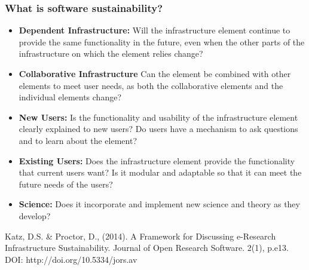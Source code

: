 \begin{frame}
\frametitle{What is software sustainability?} 
\begin{itemize}
\item {\bf Dependent Infrastructure:} Will the infrastructure element continue to provide the same functionality in the future, even when the other parts of the infrastructure on which the element relies change?
\item {\bf Collaborative Infrastructure} Can the element be combined with other elements to meet user needs, as both the collaborative elements and the individual elements change?
\item {\bf New Users:} Is the functionality and usability of the infrastructure element clearly explained to new users? Do users have a mechanism to ask questions and to learn about the element?
\item {\bf Existing Users:} Does the infrastructure element provide the functionality that current users want? Is it modular and adaptable so that it can meet the future needs of the users?
\item {\bf Science:} Does it incorporate and implement new science and theory as they develop?
\end{itemize}

\tiny{ Katz, D.S. \& Proctor, D., (2014). A Framework for Discussing e-Research Infrastructure Sustainability. Journal of Open Research Software. 2(1), p.e13. DOI: http://doi.org/10.5334/jors.av}
\end{frame}


